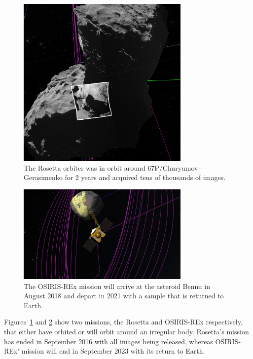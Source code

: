\begin{figure}
\centering
\includegraphics[width=0.75\textwidth]{figures/contributions/sc/rosetta.jpg}
\caption{The Rosetta orbiter was in orbit around 67P/Churyumov–Gerasimenko for 2 years and acquired tens of thousands of images.}
\label{contributions:astro:sc:rosetta}
\end{figure}

\begin{figure}
\centering
\includegraphics[width=0.75\textwidth]{figures/contributions/sc/osiris_rex.png}
\caption{The OSIRIS-REx mission will arrive at the asteroid Bennu in August 2018 and depart in 2021 with a sample that is returned to Earth.}
\label{contributions:astro:sc:osirisrex}
\end{figure}

Figures~\ref{contributions:astro:sc:rosetta} and \ref{contributions:astro:sc:osirisrex} show two missions, the Rosetta and OSIRIS-REx respectively, that either have orbited or will orbit around an irregular body.  Rosetta's mission has ended in September 2016 with all images being released, whereas OSIRIS-REx' mission will end in September 2023 with its return to Earth.

